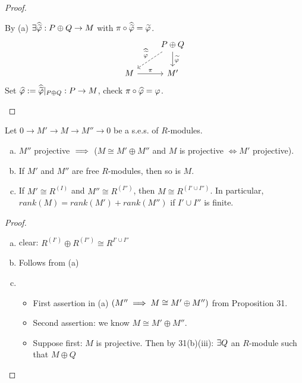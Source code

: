 \documentclass[a4paper]{report}
\begin{document}
\begin{proof}
\begin{enumerate}[(a)]
\begin{itemize}
                By (a) $\exists \widehat{\widetilde {\varphi}} : P \oplus Q \to M$ with $\pi \circ \widehat{\widetilde {\varphi}} = \widetilde {\varphi}$.
                \[\begin{tikzcd}
                   & P \oplus Q \arrow[d, "\tilde \ph"] \arrow[ld, "\hat{\tilde \ph}"', dashed] \\
M \arrow[r, "\pi"] & M'
\end{tikzcd}\]
                Set $\widehat {\varphi}:= \widehat{\widetilde {\varphi}}|_{P \oplus Q}: P \to M$, check $\pi \circ \widehat {\varphi} = \varphi$. \qedhere
        \end{itemize}
\end{enumerate}
\end{proof}

\begin{cor}%
  Let $0 \to M' \to M \to M'' \to 0$ be a s.e.s. of $R$-modules.
  \begin{enumerate}[(a)]
    \item $M''$ projective $\implies$ ($M \cong M' \oplus M''$ and $M$ is projective $\iff M'$ projective).
    \item If $M'$ and $M''$ are free $R$-modules, then so is $M$. %
          \item If $M' \cong R^{(I)}$ and $M'' \cong R^{(I'')}$, then $M \cong R^{(I' \cup I'')}$. In particular, $rank(M) = rank(M') + rank(M'')$ if $I' \cup I''$ is finite.
  \end{enumerate}
\end{cor}
\begin{proof}
  \begin{enumerate}[(c)] %
    \item clear: $R^{(I')} \oplus R^{(I'')} \cong R^{I'  \cup I''}$
    \item Follows from (a)
    \item
          \begin{itemize}
            \item First assertion in (a) $(M'' \implies M \cong M' \oplus M'')$ from Proposition 31.
            \item Second assertion: we know $M \cong M' \oplus M''$.
                  \item Suppose first: $M$ is projective. Then by 31(b)(iii): $\exists Q$ an $R$-module such that $M \oplus Q$
          \end{itemize}

\end{enumerate}

\end{proof}
\end{document}
